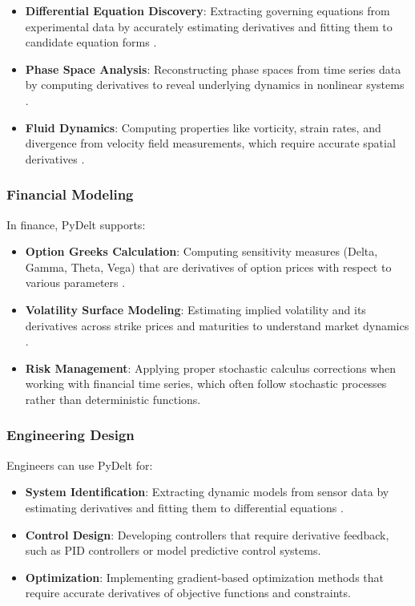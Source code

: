 \documentclass[11pt,a4paper]{article}
\begin{document}
\begin{itemize}
    \item \textbf{Differential Equation Discovery}: Extracting governing equations from experimental data by accurately estimating derivatives and fitting them to candidate equation forms \citep{raissi2019physics}.
    
    \item \textbf{Phase Space Analysis}: Reconstructing phase spaces from time series data by computing derivatives to reveal underlying dynamics in nonlinear systems \citep{boker2002method}.
    
    \item \textbf{Fluid Dynamics}: Computing properties like vorticity, strain rates, and divergence from velocity field measurements, which require accurate spatial derivatives \citep{shu1998essentially}.
\end{itemize}

\subsubsection{Financial Modeling}

In finance, PyDelt supports:

\begin{itemize}
    \item \textbf{Option Greeks Calculation}: Computing sensitivity measures (Delta, Gamma, Theta, Vega) that are derivatives of option prices with respect to various parameters \citep{cont2004financial}.
    
    \item \textbf{Volatility Surface Modeling}: Estimating implied volatility and its derivatives across strike prices and maturities to understand market dynamics \citep{aitsahalia2014high}.
    
    \item \textbf{Risk Management}: Applying proper stochastic calculus corrections when working with financial time series, which often follow stochastic processes rather than deterministic functions.
\end{itemize}

\subsubsection{Engineering Design}

Engineers can use PyDelt for:

\begin{itemize}
    \item \textbf{System Identification}: Extracting dynamic models from sensor data by estimating derivatives and fitting them to differential equations \citep{solak2003derivative}.
    
    \item \textbf{Control Design}: Developing controllers that require derivative feedback, such as PID controllers or model predictive control systems.
    
    \item \textbf{Optimization}: Implementing gradient-based optimization methods that require accurate derivatives of objective functions and constraints.
\end{itemize}
\end{document}
